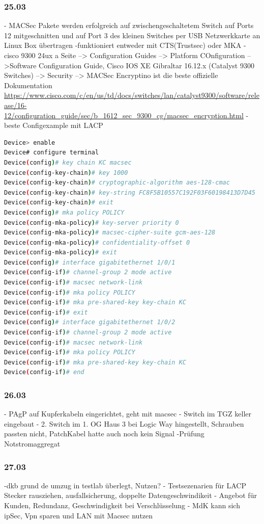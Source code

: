 \documentclass[english,runningheads,a4paper]{llncs}[2018/03/10]
\begin{document}
\subsubsection{25.03}
- MACSec Pakete werden erfolgreich auf zwischengeschaltetem Switch auf Ports 12 mitgeschnitten und auf Port 3 des kleinen Switches per USB Netzwerkkarte an Linux Box übertragen
-funktioniert entweder mit CTS(Trustsec) oder MKA 
-cisco 9300 24ux a Seite --> Configuration Guides --> Platform COnfiguration -->Software Configuration Guide, Cisco IOS XE Gibraltar 16.12.x (Catalyst 9300 Switches) --> Security --> MACSec Encryptino ist die beste offizielle Dokumentation \url{https://www.cisco.com/c/en/us/td/docs/switches/lan/catalyst9300/software/release/16-12/configuration_guide/sec/b_1612_sec_9300_cg/macsec_encryption.html}
- beste Configexample mit LACP
\begin{lstlisting}[language=bash]
Device> enable
Device# configure terminal
Device(config)# key chain KC macsec
Device(config-key-chain)# key 1000
Device(config-key-chain)# cryptographic-algorithm aes-128-cmac
Device(config-key-chain)# key-string FC8F5B10557C192F03F60198413D7D45
Device(config-key-chain)# exit
Device(config)# mka policy POLICY
Device(config-mka-policy)# key-server priority 0
Device(config-mka-policy)# macsec-cipher-suite gcm-aes-128
Device(config-mka-policy)# confidentiality-offset 0
Device(config-mka-policy)# exit
Device(config)# interface gigabitethernet 1/0/1
Device(config-if)# channel-group 2 mode active
Device(config-if)# macsec network-link
Device(config-if)# mka policy POLICY
Device(config-if)# mka pre-shared-key key-chain KC
Device(config-if)# exit
Device(config)# interface gigabitethernet 1/0/2
Device(config-if)# channel-group 2 mode active
Device(config-if)# macsec network-link
Device(config-if)# mka policy POLICY
Device(config-if)# mka pre-shared-key key-chain KC
Device(config-if)# end
\end{lstlisting}

\subsubsection{26.03}
- PAgP auf Kupferkabeln eingerichtet, geht mit macsec
- Switch im TGZ keller eingebaut
- 2. Switch im 1. OG Haus 3 bei Logic Way hingestellt, Schrauben passten nicht, PatchKabel hatte auch noch kein Signal
-Prüfung Notstromaggregat
\subsubsection{27.03}
-dkb grund de umzug in testlab überlegt, Nutzen?
- Testsezenarien für LACP Stecker rausziehen, ausfallsicherung, doppelte Datengeschwindikeit
- Angebot für Kunden, Redundanz, Geschwindigkeit bei Verschlüsselung
- MdK kann sich ipSec, Vpn sparen und LAN mit Macsec nutzen
\end{document}
